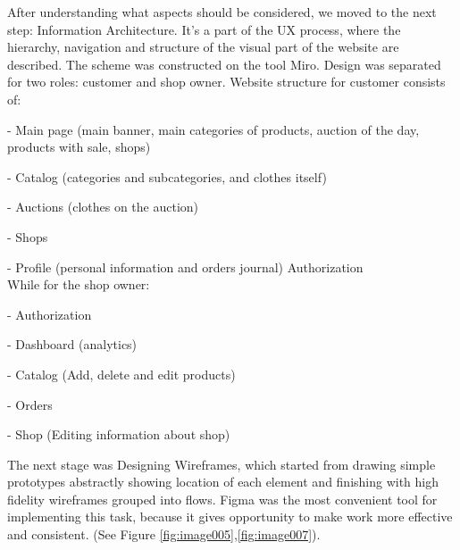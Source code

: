 After understanding what aspects should be considered, we moved to the next step: Information Architecture. It’s a part of the UX process, where the hierarchy, navigation and structure of the visual part of the website are described. The scheme was constructed on the tool Miro. Design was separated for two roles: customer and shop owner.
Website structure for customer consists of: 

- Main page (main banner, main categories of products, auction of the day, products with sale, shops)

- Catalog (categories and subcategories, and clothes itself)

- Auctions (clothes on the auction)

- Shops

- Profile (personal information and orders journal)
Authorization\\

While for the shop owner:

- Authorization

- Dashboard (analytics)

- Catalog (Add, delete and edit products)

- Orders

- Shop (Editing information about shop)

The next stage was Designing Wireframes, which started from drawing simple prototypes abstractly showing location of each element and finishing with high fidelity wireframes grouped into flows. Figma was the most convenient tool for implementing this task, because it gives opportunity to make work more effective and consistent. (See Figure \ref{fig:image005},\ref{fig:image007}).

